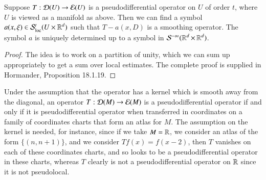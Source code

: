\begin{lemma}
    Suppose $T: \operatorname{\mathcal{D}}(U) \to \operatorname{\mathcal{E}}(U)$ is a pseudodifferential operator on $U$ of order $t$, where $U$ is viewed as a manifold as above. Then we can find a symbol $a(x,\xi) \in \mathcal{S}^t_{\text{loc}}(U \times \operatorname{\mathbb{R}}^d)$ such that $T - a(x,D)$ is a smoothing operator. The symbol $a$ is uniquely determined up to a symbol in $\mathcal{S}^{-\infty}(\operatorname{\mathbb{R}}^d \times \operatorname{\mathbb{R}}^d)$.
\end{lemma}
\begin{proof}
    The idea is to work on a partition of unity, which we can sum up appropriately to get a sum over local estimates. The complete proof is supplied in Hormander, Proposition 18.1.19.
\end{proof}

\begin{remark}
    Under the assumption that the operator has a kernel which is smooth away from the diagonal, an operator $T: \operatorname{\mathcal{D}}(M) \to \operatorname{\mathcal{E}}(M)$ is a pseudodifferential operator if and only if it is pseudodifferential operator when transferred in coordinates on a family of coordinates charts that form an atlas for $M$. The assumption on the kernel is needed, for instance, since if we take $M = \operatorname{\mathbb{R}}$, we consider an atlas of the form $\{ (n, n+1) \}$, and we consider $Tf(x) = f(x - 2)$, then $T$ vanishes on each of these coordinates charts, and so looks to be a pseudodifferential operator in these charts, whereas $T$ clearly is not a pseudodifferential operator on $\operatorname{\mathbb{R}}$ since it is not pseudolocal.
\end{remark}

